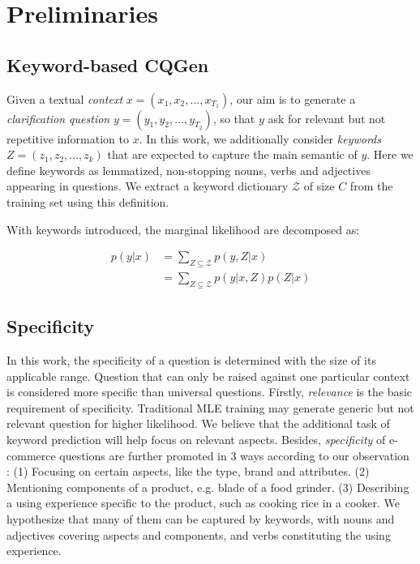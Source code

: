 \section{Preliminaries}

\subsection{Keyword-based CQGen}
Given a textual \textit{context} $x = (x_1, x_2, ..., x_{T_1})$, our aim is to generate a \textit{clarification question} $y = (y_1, y_2, ..., y_{T_2})$, so that $y$ ask for relevant but not repetitive information to $x$. In this work, we additionally consider \textit{keywords} $Z = (z_1, z_2, ..., z_k)$ that are expected to capture the main semantic of $y$. Here we define keywords as lemmatized, non-stopping nouns, verbs and adjectives appearing in questions. We extract a keyword dictionary $\mathcal{Z}$ of size $C$ from the training set using this definition. 

With keywords introduced, the marginal likelihood are decomposed as:

\begin{equation}
  \begin{split}
    p(y|x) &= \sum_{Z \subseteq \mathcal{Z}}p(y, Z|x) \\ 
    &= \sum_{Z \subseteq \mathcal{Z}}p(y|x,Z)p(Z|x)
  \end{split}
  \label{equ:decompose}
\end{equation}

\subsection{Specificity}
\label{sec:specific}
In this work, the specificity of a question is determined with the size of its applicable range. Question that can only be raised against one particular context is considered more specific than universal questions. Firstly, \textit{relevance} is the basic requirement of specificity. Traditional MLE training may generate generic but not relevant question for higher likelihood. 
We believe that the additional task of keyword prediction will help focus on relevant aspects. Besides, \textit{specificity} of e-commerce questions are further promoted in 3 ways according to our observation : (1) Focusing on certain aspects, like the type, brand and attributes. (2) Mentioning components of a product, e.g. blade of a food grinder. (3) Describing a using experience specific to the product, such as cooking rice in a cooker. We hypothesize that many of them can be captured by keywords, with nouns and adjectives covering aspects and components, and verbs constituting the using experience.

